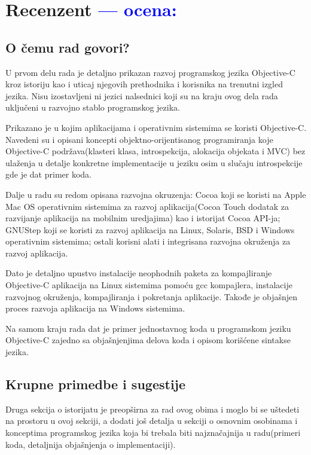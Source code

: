 \documentclass[a4paper]{report}
\newcommand{\odgovor}[1]{\textcolor{blue}{#1}}
\begin{document}
\chapter{Recenzent \odgovor{--- ocena:} }


\section{O čemu rad govori?}
U prvom delu rada je detaljno prikazan razvoj programskog jezika Objective-C kroz istoriju kao i uticaj njegovih prethodnika i korisnika na trenutni izgled jezika. Nisu izostavljeni ni jezici nalsednici koji su na kraju ovog dela rada uključeni u razvojno stablo programskog jezika.

Prikazano je u kojim aplikacijama i operativnim sistemima se koristi Objective-C. Navedeni su i opisani koncepti objektno-orijentisanog programiranja koje Objective-C podržava(klasteri klasa, introspekcija, alokacija objekata i MVC) bez ulaženja u detalje konkretne implementacije u jeziku osim u slučaju introspekcije gde je dat primer koda.

Dalje u radu su redom opisana razvojna okruzenja: Cocoa koji se koristi na Apple Mac OS operativnim sistemima za razvoj aplikacija(Cocoa Touch dodatak za razvijanje aplikacija na mobilnim uredjajima) kao i istorijat Cocoa API-ja; GNUStep koji se koristi za razvoj aplikacija na Linux, Solaris, BSD i Windows operativnim sistemima; ostali korisni alati i integrisana razvojna okruženja za razvoj aplikacija.

Dato je detaljno upustvo instalacije neophodnih paketa za kompajliranje Objective-C aplikacija na Linux sistemima pomoću gcc kompajlera, instalacije razvojnog okruženja, kompajliranja i pokretanja aplikacije. Takođe je objašnjen proces razvoja aplikacija na Windows sistemima.

Na samom kraju rada dat je primer jednostavnog koda u programskom jeziku Objective-C zajedno sa objašnjenjima delova koda i opisom korišćene sintakse jezika.

\section{Krupne primedbe i sugestije}
Druga sekcija o istorijatu je preopširna za rad ovog obima i moglo bi se uštedeti na prostoru u ovoj sekciji, a dodati još detalja u sekciji o osnovnim osobinama i konceptima programskog jezika koja bi trebala biti najznačajnija u radu(primeri koda, detaljnija objašnjenja o implementaciji).
\end{document}
